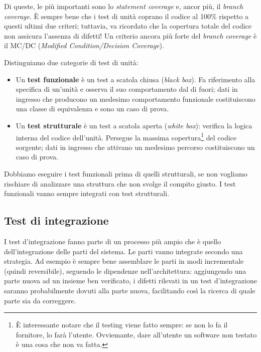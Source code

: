 \documentclass[a4paper]{article}
\begin{document}
		
Di queste, le più importanti sono lo \emph{statement coverage} e, ancor più, il \emph{branch coverage}. È sempre bene che i test di unità coprano il codice al 100\% rispetto a questi ultimi due criteri; tuttavia, va ricordato che la copertura totale del codice non assicura l'assenza di difetti! Un criterio ancora più forte del \emph{branch coverage} è il MC/DC (\emph{Modified Condition/Decision Coverage}).
		
Distinguiamo due categorie di test di unità:
		
	\begin{itemize}
		
			
	\item Un \textbf{test funzionale} è un test a scatola chiusa (\emph{black box}). Fa riferimento alla specifica di un'unità e osserva il suo comportamento dal di fuori; dati in ingresso che producono un medesimo comportamento funzionale costituiscono una classe di equivalenza e sono un caso di prova.
			
	\item Un \textbf{test strutturale} è un test a scatola aperta (\emph{white box}): verifica la logica interna del codice dell'unità. Persegue la massima copertura\footnote{È interessante notare che il testing viene fatto sempre: se non lo fa il fornitore, lo farà l'utente. Ovviemante, dare all'utente un software non testato è una cosa che non va fatta.} del codice sorgente; dati in ingresso che attivano un medesimo percorso costituiscono un caso di prova.
		
	\end{itemize}

		
Dobbiamo eseguire i test funzionali prima di quelli strutturali, se non vogliamo rischiare di analizzare una struttura che non svolge il compito giusto. I test funzionali vanno sempre integrati con test strutturali.

		
	\subsection{Test di integrazione}

		
I test d'integrazione fanno parte di un processo più ampio che è quello dell'integrazione delle parti del sistema. Le parti vanno integrate secondo una strategia. Ad esempio è sempre bene assemblare le parti in modi incrementale (quindi reversibile), seguendo le dipendenze nell'architettura: aggiungendo una parte nuova ad un insieme ben verificato, i difetti rilevati in un test d'integrazione saranno probabilmente dovuti alla parte nuova, facilitando così la ricerca di quale parte sia da correggere.
		
\end{document}
